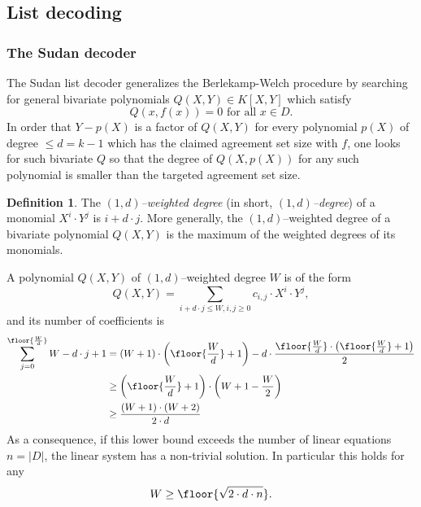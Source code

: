 \documentclass[11pt]{article}
\theoremstyle{definition}
\newtheorem{defn}[thm]{Definition}
\theoremstyle{remark}
\begin{document}
\subsection{List decoding}
\label{s:ListDecoding}

\subsubsection{The Sudan decoder}

The Sudan list decoder \cite{Sudan} generalizes the Berlekamp-Welch procedure by searching for general bivariate polynomials $Q(X,Y)\in K[X,Y]$ which satisfy
\[
Q(x,f(x)) = 0 \text{ for all } x\in D.
\]
In order that $Y-p(X)$ is a factor of $Q(X,Y)$ for every polynomial $p(X)$ of degree $\leq d=k-1$ which has the claimed agreement set size with $f$,  one looks for such bivariate $Q$ so that the degree of $Q(X,p(X))$ for any such polynomial is smaller than the targeted agreement set size.

\begin{defn}
The \textit{$(1,d)$--weighted degree} (in short, \textit{$(1,d)$--degree}) of a monomial $X^i\cdot Y^j$ is $i+d\cdot j$. 
More generally, the $(1,d)$--weighted degree of a  bivariate polynomial $Q(X,Y)$ is the maximum of the weighted degrees of its monomials.
\end{defn}

A polynomial $Q(X,Y)$ of $(1,d)$--weighted degree $W$ is of the form
\[
Q(X,Y) = \sum_{i+d\cdot j\leq W, i,j\geq 0} c_{i,j} \cdot X^i\cdot Y^j,
\]
and its number of coefficients is 
\begin{align*}
\sum_{j=0}^{\floor{\nicefrac{W}{d}}} W - d\cdot j+1 &= (W+1)\cdot \left(\floor{\frac{W}{d}}+ 1\right) - d\cdot \frac{\floor{\frac{W}{d}}\cdot\left(\floor{\frac{W}{d}}+1\right)}{2}
\\
& \geq \left(\floor{\frac{W}{d}}+ 1\right)\cdot \left(W + 1 - \frac{W}{2}\right)
\\
& \geq \frac{(W+1)\cdot (W+2)}{2\cdot d}
\end{align*}
As a consequence, if this lower bound exceeds the number of linear equations $n=|D|$, the linear system has a non-trivial solution.  
In particular this holds for any 
\[
W \geq \floor{\sqrt{2\cdot d\cdot n}}.
\]
\end{document}
